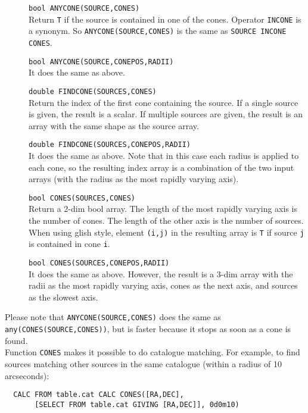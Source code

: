 \begin{description}
  \item[] \texttt{bool ANYCONE(SOURCE,CONES)}\\
       Return \texttt{T} if the source is contained in one of the cones.
       Operator \texttt{INCONE} is a synonym. So
       \texttt{ANYCONE(SOURCE,CONES)} is the same as
       \texttt{SOURCE INCONE CONES}.
  \item[] \texttt{bool ANYCONE(SOURCE,CONEPOS,RADII)}\\
       It does the same as above.
  \item[] \texttt{double FINDCONE(SOURCES,CONES)}\\
       Return the index of the first cone containing the source.
       If a single source is given, the result is a scalar.
       If multiple sources are given, the result is an array with the
       same shape as the source array.
  \item[] \texttt{double FINDCONE(SOURCES,CONEPOS,RADII)}\\
       It does the same as above. Note that in this case each radius is
       applied to each cone, so the resulting index array
       is a combination of the two input arrays
       (with the radius as the most rapidly varying axis).
  \item[] \texttt{bool CONES(SOURCES,CONES)}\\
       Return a 2-dim bool array. The length of the most rapidly
       varying axis is the
       number of cones. The length of the other axis is the number of
       sources. When using glish style, element \texttt{(i,j)}
       in the resulting array is \texttt{T}
       if source \texttt{j} is contained in cone \texttt{i}.
  \item[] \texttt{bool CONES(SOURCES,CONEPOS,RADII)}\\
       It does the same as above. However, the result is a 3-dim array
       with the radii as the most rapidly varying axis, cones as the
       next axis, and sources as the slowest axis.
\end{description}
Please note that \texttt{ANYCONE(SOURCE,CONES)} does the same as
\texttt{any(CONES(SOURCE,CONES))}, but is faster because it stops as
soon as a cone is found.
\\Function \texttt{CONES} makes it possible to do catalogue matching.
For example, to find sources matching other sources in the same
catalogue (within a radius of 10 arcseconds):
\begin{verbatim}
  CALC FROM table.cat CALC CONES([RA,DEC],
       [SELECT FROM table.cat GIVING [RA,DEC]], 0d0m10)
\end{verbatim}

